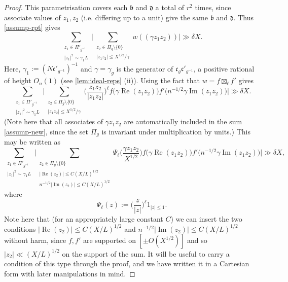 \documentclass[11pt,reqno]{amsart}
\numberwithin{equation}{section}
\theoremstyle{definition}
\theoremstyle{remark}
\newcommand{\mf}{\mathfrak}
\newcommand{\on}{\operatorname}
\renewcommand{\le}{\leqslant}
\renewcommand{\Re}{\on{Re}}
\renewcommand{\Im}{\on{Im}}
\begin{document}
\begin{proof}
This parametrisation covers each $\mf{b}$ and $\mf{d}$ a total of $r^2$ times, since associate values of $z_1, z_2$ (i.e. differing up to a unit) give the same $\mf{b}$ and $\mf{d}$. Thus \cref{assump-rpt} gives
\begin{equation}\label{assump-new}
\sum_{\substack{z_1 \in \Pi'_{g^{-1}} \\ |z_1|^2 \sim \gamma_1 L}} \Big| \sum_{\substack{z_2 \in \Pi_g \setminus \{0\} \\ |z_1 z_2| \le X^{1/2}/\gamma} } w((\gamma z_1 z_2 ))\Big| \gg \delta X.
\end{equation}
Here, $\gamma_1 := (N\mf{c}'_{g^{-1}})^{-1}$ and $\gamma = \gamma_g$ is the generator of $\mf{c}_g \mf{c}'_{g^{-1}}$, a positive rational of height $O_n(1)$ (see \cref{lem:ideal-reps} (ii)). Using the fact that $w = f \boxtimes_{\ell} f'$ gives
\begin{equation}\label{636465}\sum_{\substack{z_1 \in \Pi'_{g^{-1}} \\ |z_1|^2 \sim \gamma_1 L}} \Big| \sum_{\substack{ z_2 \in \Pi_g \setminus \{0\} \\ |z_1 z_2| \le X^{1/2}/\gamma}} \Big(\frac{z_1 z_2}{| z_1 z_2|}\Big)^{\ell}f\big(\gamma \Re (z_1 z_2)\big) f'\big( n^{-1/2}\gamma  \Im ( z_1 z_2)\big) \Big| \gg \delta X. \end{equation} (Note here that all associates of $\gamma z_1 z_2$ are automatically included in the sum \cref{assump-new}, since the set $\Pi_g$ is invariant under multiplication by units.)
This may be written as 
\begin{equation}\label{eq528} \sum_{\substack{z_1 \in \Pi'_{g^{-1}} \\ |z_1|^2 \sim \gamma_1 L}} \Big| \sum_{\substack{z_2 \in \Pi_g \setminus \{0\} \\ |\Re(z_2)| \le  C(X/L)^{1/2} \\  n^{-1/2}|\Im(z_2)| \le C(X/L)^{1/2}}} \Psi_{\ell}\Big(\frac{\gamma z_1 z_2}{X^{1/2}}\Big) f\big(\gamma \Re (z_1 z_2)\big) f'\big( n^{-1/2}\gamma  \Im ( z_1 z_2)\big) \Big| \gg \delta X, \end{equation}
where 
\begin{equation}\label{r-sector} \Psi_{\ell}(z)  := \Big(\frac{z}{|z|}\Big)^{\ell} 1_{|z| \le 1}. \end{equation}
Note here that (for an appropriately large constant $C$) we can insert the two conditions $|\Re(z_2)| \le  C(X/L)^{1/2}$ and $n^{-1/2}|\Im(z_2)| \le C(X/L)^{1/2}$ without harm, since $f, f'$ are supported on $[\pm O(X^{1/2})]$ and so $|z_2| \ll (X/L)^{1/2}$ on the support of the sum. It will be useful to carry a condition of this type through the proof, and we have written it in a Cartesian form with later manipulations in mind.


\end{proof}
\end{document}
